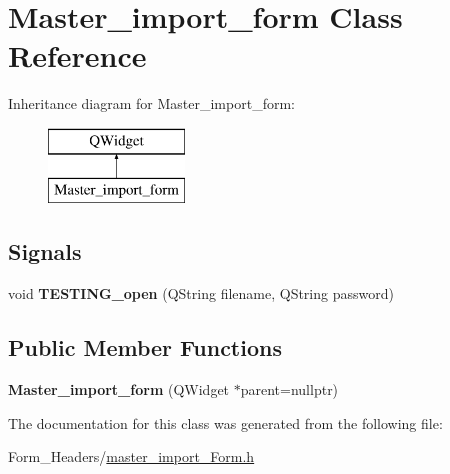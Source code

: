 \hypertarget{class_master__import__form}{}\section{Master\+\_\+import\+\_\+form Class Reference}
\label{class_master__import__form}
Inheritance diagram for Master\+\_\+import\+\_\+form\+:\begin{figure}[H]
\begin{center}
\leavevmode
\includegraphics[height=2.000000cm]{class_master__import__form}
\end{center}
\end{figure}
\subsection*{Signals}
\begin{DoxyCompactItemize}
\item 
\mbox{\label{class_master__import__form_a724101ac1658d62dff1100a43c2fe7ba}} 
void {\bfseries T\+E\+S\+T\+I\+N\+G\+\_\+open} (Q\+String filename, Q\+String password)
\end{DoxyCompactItemize}
\subsection*{Public Member Functions}
\begin{DoxyCompactItemize}
\item 
\mbox{\label{class_master__import__form_a862a6ec57ae97b7d754bb942d6bc6314}} 
{\bfseries Master\+\_\+import\+\_\+form} (Q\+Widget $\ast$parent=nullptr)
\end{DoxyCompactItemize}


The documentation for this class was generated from the following file\+:\begin{DoxyCompactItemize}
\item 
Form\+\_\+\+Headers/\mbox{\hyperlink{master__import___form_8h}{master\+\_\+import\+\_\+\+Form.\+h}}\end{DoxyCompactItemize}

